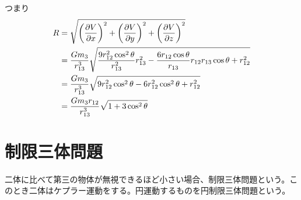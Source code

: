     つまり
    \begin{align*}
        R &= \sqrt{\lr{\pd[V]{x}}^2 + \lr{\pd[V]{y}}^2 + \lr{\pd[V]{z}}^2}\\
        &= \frac{Gm_3}{r_{13}^3}\sqrt{ \frac{9r_{12}^2\cos^2\theta}{r_{13}^2}r_{13}^2 - \frac{6r_{12}\cos\theta}{r_{13}}r_{12}r_{13}\cos\theta + r_{12}^2 }\\
        &= \frac{Gm_3}{r_{13}^3}\sqrt{ 9r_{12}^2\cos^2\theta - 6r_{12}^2\cos^2\theta + r_{12}^2 }\\
        &= \frac{Gm_3r_{12}}{r_{13}^3}\sqrt{ 1 + 3\cos^2\theta }
    \end{align*}

\section{制限三体問題}
	二体に比べて第三の物体が無視できるほど小さい場合、制限三体問題という。このとき二体はケプラー運動をする。円運動するものを円制限三体問題という。


